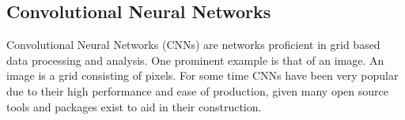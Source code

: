 
\subsection{Convolutional Neural Networks}
Convolutional Neural Networks (CNNs) are networks proficient in grid based data processing and analysis. One prominent example is that of an image. An image is a grid consisting of pixels. For some time CNNs have been very popular due to their high performance and ease of production, given many open source tools and packages exist to aid in their construction. 

